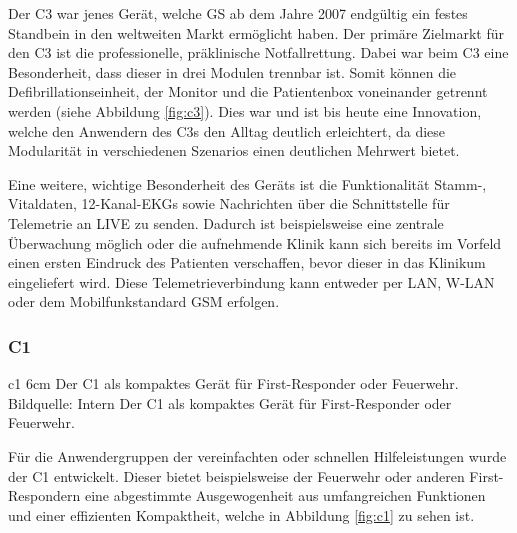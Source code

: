 Der \gls{C3} war jenes Gerät, welche \gls{GS} ab dem Jahre 2007 endgültig ein festes Standbein in den weltweiten Markt ermöglicht haben.
Der primäre Zielmarkt für den \gls{C3} ist die professionelle, präklinische Notfallrettung.
Dabei war beim \gls{C3} eine Besonderheit, dass dieser in drei Modulen trennbar ist.
Somit können die Defibrillationseinheit, der Monitor und die Patientenbox voneinander getrennt werden (siehe Abbildung \ref{fig:c3}).
Dies war und ist bis heute eine Innovation, welche den Anwendern des \gls{C3}s den Alltag deutlich erleichtert, da diese Modularität in verschiedenen Szenarios einen deutlichen Mehrwert bietet.

Eine weitere, wichtige Besonderheit des Geräts ist die Funktionalität Stamm-, Vitaldaten, 12-Kanal-\gls{EKG}s sowie Nachrichten über die Schnittstelle für Telemetrie an \gls{LIVE} zu senden.
Dadurch ist beispielsweise eine zentrale Überwachung möglich oder die aufnehmende Klinik kann sich bereits im Vorfeld einen ersten Eindruck des Patienten verschaffen, bevor dieser in das Klinikum eingeliefert wird.
Diese Telemetrieverbindung kann entweder per LAN, W-LAN oder dem Mobilfunkstandard GSM erfolgen.





\subsubsection{\acrlong*{C1}}
\bild
{c1}
{6cm}
{Der \acrlong{C1} als kompaktes Gerät für First-Responder oder Feuerwehr. Bildquelle: Intern}
{Der \acrlong*{C1} als kompaktes Gerät für First-Responder oder Feuerwehr.}

Für die Anwendergruppen der vereinfachten oder schnellen Hilfeleistungen wurde der \gls{C1} entwickelt.
Dieser bietet beispielsweise der Feuerwehr oder anderen First-Respondern eine abgestimmte Ausgewogenheit aus umfangreichen Funktionen und einer effizienten Kompaktheit, welche in Abbildung \ref{fig:c1} zu sehen ist.



